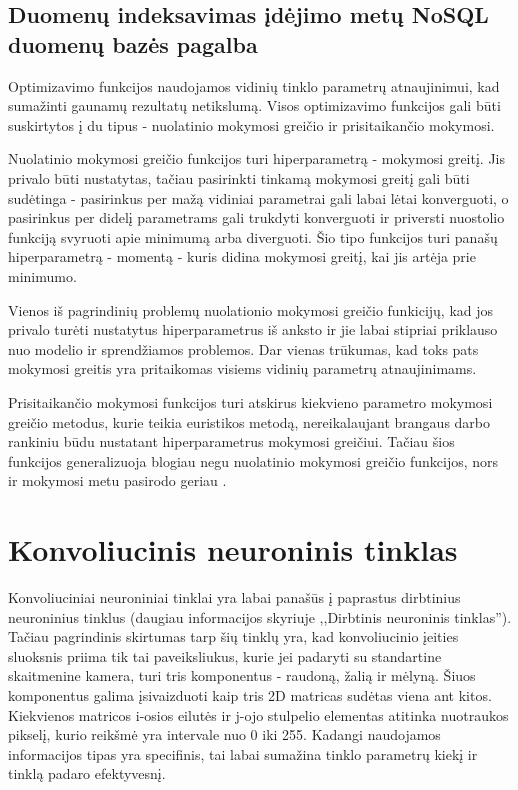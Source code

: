 \documentclass{VUMIFPSkursinis}
\begin{document}
\subsection{Duomenų indeksavimas įdėjimo metų NoSQL duomenų bazės pagalba}
Optimizavimo funkcijos naudojamos vidinių tinklo parametrų atnaujinimui, kad sumažinti gaunamų rezultatų netikslumą. 
Visos optimizavimo funkcijos gali būti suskirtytos į du tipus - nuolatinio mokymosi greičio ir prisitaikančio mokymosi.

Nuolatinio mokymosi greičio funkcijos turi hiperparametrą - mokymosi greitį. Jis privalo būti nustatytas, tačiau 
pasirinkti tinkamą mokymosi greitį gali būti sudėtinga - pasirinkus per mažą vidiniai parametrai gali labai lėtai 
konverguoti, o pasirinkus per didelį parametrams gali trukdyti konverguoti ir priversti nuostolio funkciją svyruoti
apie minimumą arba diverguoti. Šio tipo funkcijos turi panašų hiperparametrą - momentą - kuris didina mokymosi greitį, 
kai jis artėja prie minimumo. 

Vienos iš pagrindinių problemų nuolationio mokymosi greičio funkicijų, kad jos privalo turėti nustatytus hiperparametrus 
iš anksto ir jie labai stipriai priklauso nuo modelio ir sprendžiamos problemos. Dar vienas trūkumas, kad toks pats 
mokymosi greitis yra pritaikomas visiems vidinių parametrų atnaujinimams.

Prisitaikančio mokymosi funkcijos turi atskirus kiekvieno parametro mokymosi greičio metodus, kurie teikia euristikos 
metodą, nereikalaujant brangaus darbo rankiniu būdu nustatant hiperparametrus mokymosi greičiui. Tačiau šios funkcijos 
generalizuoja blogiau negu nuolatinio mokymosi greičio funkcijos, nors ir mokymosi metu pasirodo geriau \cite{2017arXiv170508292W}.



\section{Konvoliucinis neuroninis tinklas}
Konvoliuciniai neuroniniai tinklai yra labai panašūs į paprastus dirbtinius neuroninius tinklus (daugiau informacijos skyriuje ,,Dirbtinis neuroninis
tinklas''). Tačiau pagrindinis skirtumas tarp šių tinklų yra, kad konvoliucinio įeities sluoksnis priima tik tai paveiksliukus, 
kurie jei padaryti su standartine skaitmenine kamera, turi tris komponentus - raudoną, žalią ir mėlyną. Šiuos komponentus galima 
įsivaizduoti kaip tris 2D matricas sudėtas viena ant kitos. Kiekvienos matricos i-osios eilutės ir j-ojo stulpelio elementas 
atitinka nuotraukos pikselį, kurio reikšmė yra intervale nuo 0 iki 255. Kadangi naudojamos informacijos tipas yra specifinis, 
tai labai sumažina tinklo parametrų kiekį ir tinklą padaro efektyvesnį.
\end{document}
